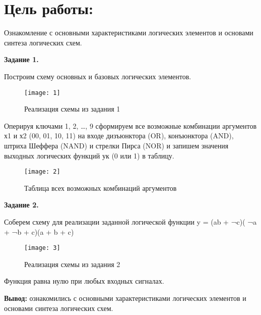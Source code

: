 \documentclass[spec, och, labwork]{shiza}
\begin{document}
\section{Цель работы:}

Ознакомление с основными характеристиками логических элементов и основами синтеза логических схем.

\textbf{Задание 1.}

Построим схему основных и базовых логических элементов.

    \begin{figure}[H]
        \centering      %
        \texttt{[image: 1]}
        \caption{Реализация схемы из задания 1}
        \label{fig:image1}
    \end{figure}
        
    Оперируя ключами 1, 2, …, 9 сформируем все возможные комбинации аргументов х1 и х2 (00, 01, 10, 11) на входе 
    дизъюнктора (OR), конъюнктора (AND), штриха Шеффера (NAND) и стрелки Пирса (NOR) и запишем значения выходных 
    логических функций ук (0 или 1) в таблицу.

    \begin{figure}[H]
        \centering      %
        \texttt{[image: 2]}
        \caption{Таблица всех возможных комбинаций аргументов}
        \label{fig:image1}
    \end{figure}
        
\textbf{Задание 2.}

Соберем схему для реализации заданной логической функции y = (ab + ¬c)( ¬a + ¬b + c)(a + b + c)

    \begin{figure}[H]
        \centering      %
        \texttt{[image: 3]}
        \caption{Реализация схемы из задания 2}
        \label{fig:image1}
    \end{figure}

Функция равна нулю при любых входных сигналах.

\textbf{Вывод:} ознакомились с основными характеристиками логических элементов и основами синтеза логических схем.\\
\end{document}
